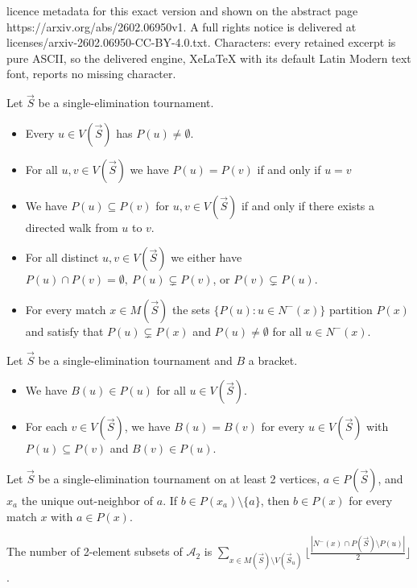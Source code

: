 \documentclass[10pt,a4paper]{amsart}
\newcommand{\sm}{\setminus}
\newcommand{\sub}{\subseteq}
\newcommand{\tour}{\vec{S}}
\renewcommand{\c}[1]{\mathcal{#1}}
\begin{document}
licence metadata for this exact version and shown on the abstract page https://arxiv.org/abs/2602.06950v1. A full rights notice is delivered at licenses/arxiv-2602.06950-CC-BY-4.0.txt. Characters: every retained excerpt is pure ASCII, so the delivered engine, XeLaTeX with its default Latin Modern text font, reports no missing character.
\begin{prop}\label{Pu Sets}
	Let $\tour$ be a single-elimination tournament.
	\begin{itemize}
		\item[(i)] Every $u\in V(\tour)$ has $P(u)\ne \emptyset$.
		\item[(ii)] For all $u,v\in V(\tour)$ we have $P(u)= P(v)$ if and only if $u= v$
		\item[(iii)] We have $P(u)\sub P(v)$ for $u,v\in V(\tour)$ if and only if there exists a directed walk from $u$ to $v$.
		\item[(iv)] For all distinct $u,v\in V(\tour)$ we either have $P(u)\cap P(v)=\emptyset,\ P(u)\subsetneq P(v)$, or $P(v)\subsetneq P(u)$.
		\item[(v)] For every match $x\in M(\tour)$ the sets $\{P(u):u\in N^-(x)\}$ partition $P(x)$ and satisfy that $P(u)\subsetneq P(x)$ and $P(u)\ne \emptyset$ for all $u\in N^-(x)$.
	\end{itemize}
\end{prop}

\begin{lem}\label{bracket facts}
	Let $\tour$ be a single-elimination tournament and $B$ a bracket.
	\begin{itemize}
		\item[(i)] We have $B(u)\in P(u)$ for all $u \in V(\tour)$.
		\item[(ii)] For each $v\in V(\tour)$, we have $B(u)=B(v)$ for every $u\in V(\tour)$ with $P(u)\sub P(v)$ and $B(v)\in P(u)$.
	\end{itemize}
\end{lem}

\begin{lem}\label{a implies b}
	Let $\tour$ be a single-elimination tournament on at least 2 vertices, $a\in P(\tour)$, and $x_a$ the unique out-neighbor of $a$.  If $b\in P(x_a)\sm \{a\}$, then $b\in P(x)$ for every match $x$ with $a\in P(x)$.
\end{lem}

	\begin{claim}\label{Claim A size}
		The number of 2-element subsets of $\c{A}_2$ is $\sum_{x\in M(\tour)\sm V(\tour_u)} \lfloor \frac{|N^-(x)\cap P(\tour)\sm P(u)|}{2} \rfloor$.
	\end{claim}
\end{document}
